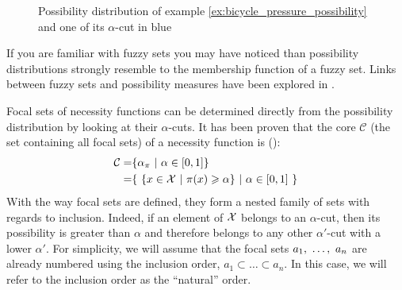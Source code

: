 \begin{figure}[!ht]
    \centering
    \caption{Possibility distribution of example \ref{ex:bicycle_pressure_possibility} and one of its $\alpha$-cut in blue}
    \label{fig:possibility_distribution}
\end{figure}

\begin{remark}
    If you are familiar with fuzzy sets you may have noticed than possibility distributions strongly resemble to the membership function of a fuzzy set. Links between fuzzy sets and possibility measures have been explored in \cite{zadeh_fuzzy_1999}.
\end{remark}

Focal sets of necessity functions can be determined directly from the possibility distribution by looking at their \( \alpha \)-cuts. It has been proven that the core $\mathcal{C}$ (the set containing all focal sets) of a necessity function is (\cite{destercke_unifying_2008}):
\begin{align*}
    \mathcal{C} =& \{\alpha_\pi~|~\alpha\in[0,1]\}\\
    =& \{ ~\{x\in\mathcal{X}~|~\pi(x)\geqslant\alpha\}~|~\alpha\in[0,1]~\}
\end{align*}
With the way focal sets are defined, they form a nested family of sets with regards to inclusion. Indeed, if an element of \(\mathcal{X}\) belongs to an \(\alpha\)-cut, then its possibility is greater than \(\alpha\) and therefore belongs to any other \(\alpha'\)-cut with a lower \(\alpha'\). For simplicity, we will assume that the focal sets \(a_1, ~\dots, ~ a_n\) are already numbered using the inclusion order, \ie \( a_1\subset\dots\subset a_n\). In this case, we will refer to the inclusion order as the ``natural'' order.

